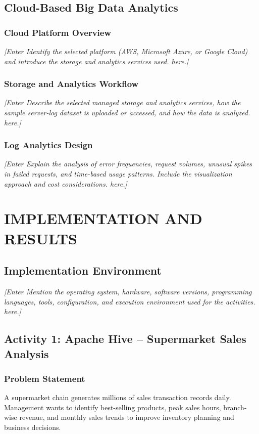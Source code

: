 \documentclass[12pt,a4paper]{report}
\newcommand{\placeholder}[1]{\textit{[Enter #1 here.]}}
\newcommand{\activityheading}[2]{%
  \section{Activity #1: #2}%
}
\begin{document}
\section{Cloud-Based Big Data Analytics}
\subsection{Cloud Platform Overview}
\placeholder{Identify the selected platform (AWS, Microsoft Azure, or
Google Cloud) and introduce the storage and analytics services used.}

\subsection{Storage and Analytics Workflow}
\placeholder{Describe the selected managed storage and analytics services,
how the sample server-log dataset is uploaded or accessed, and how the
data is analyzed.}

\subsection{Log Analytics Design}
\placeholder{Explain the analysis of error frequencies, request volumes,
unusual spikes in failed requests, and time-based usage patterns. Include
the visualization approach and cost considerations.}

\chapter{IMPLEMENTATION AND RESULTS}

\section{Implementation Environment}
\placeholder{Mention the operating system, hardware, software versions,
programming languages, tools, configuration, and execution environment
used for the activities.}

\activityheading{1}{Apache Hive -- Supermarket Sales Analysis}

\subsection{Problem Statement}
A supermarket chain generates millions of sales transaction records
daily. Management wants to identify best-selling products, peak sales
hours, branch-wise revenue, and monthly sales trends to improve
inventory planning and business decisions.
\end{document}
